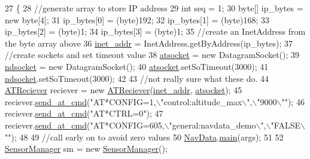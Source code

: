 \begin{DoxyCode}
27     \{
28         \textcolor{comment}{//generate array to store IP address}
29         \textcolor{keywordtype}{int} seq = 1;
30         byte[] ip\_bytes = \textcolor{keyword}{new} byte[4];
31         ip\_bytes[0] = (byte)192;
32         ip\_bytes[1] = (byte)168;
33         ip\_bytes[2] = (byte)1;
34         ip\_bytes[3] = (byte)1;
35         \textcolor{comment}{//create an InetAddress from the byte array above}
36         \hyperlink{class_drone_basics_af9aed89eb6bf900c469b8e2dd8a0ba54}{inet\_addr} = InetAddress.getByAddress(ip\_bytes);
37         \textcolor{comment}{//create sockets and set timeout value}
38         \hyperlink{class_drone_basics_adde72319658ee9fcad5d4266cf6c3ec8}{atsocket} = \textcolor{keyword}{new} DatagramSocket();
39         \hyperlink{class_drone_basics_a7257f257caa0bb8890ec9b866dad5fdc}{ndsocket} = \textcolor{keyword}{new} DatagramSocket();
40         \hyperlink{class_drone_basics_adde72319658ee9fcad5d4266cf6c3ec8}{atsocket}.setSoTimeout(3000);
41         \hyperlink{class_drone_basics_a7257f257caa0bb8890ec9b866dad5fdc}{ndsocket}.setSoTimeout(3000);
42         
43         \textcolor{comment}{//not really sure what these do.}
44         \hyperlink{class_drone_1_1_hardware_1_1_a_t_reciever}{ATReciever} reciever = \textcolor{keyword}{new} \hyperlink{class_drone_1_1_hardware_1_1_a_t_reciever}{ATReciever}(\hyperlink{class_drone_basics_af9aed89eb6bf900c469b8e2dd8a0ba54}{inet\_addr}, 
      \hyperlink{class_drone_basics_adde72319658ee9fcad5d4266cf6c3ec8}{atsocket});
45         reciever.\hyperlink{class_drone_1_1_hardware_1_1_a_t_reciever_a93352d75209626cf62bde294b35f9120}{send\_at\_cmd}(\textcolor{stringliteral}{"AT*CONFIG=1,\(\backslash\)"control:altitude\_max\(\backslash\)",\(\backslash\)"9000\(\backslash\)""});
46         reciever.\hyperlink{class_drone_1_1_hardware_1_1_a_t_reciever_a93352d75209626cf62bde294b35f9120}{send\_at\_cmd}(\textcolor{stringliteral}{"AT*CTRL=0"});
47         reciever.\hyperlink{class_drone_1_1_hardware_1_1_a_t_reciever_a93352d75209626cf62bde294b35f9120}{send\_at\_cmd}(\textcolor{stringliteral}{"AT*CONFIG=605,\(\backslash\)"general:navdata\_demo\(\backslash\)",\(\backslash\)"FALSE\(\backslash\)""});
48        
49         \textcolor{comment}{//call early on to avoid zero values}
50         \hyperlink{classworkspace_1_1_a_r_drone_nav_data_1_1src_1_1_nav_data}{NavData}.\hyperlink{classworkspace_1_1_a_r_drone_nav_data_1_1src_1_1_nav_data_ace3cd1e72bda115d0109f6f89a1e9c36}{main}(args);
51         
52         \hyperlink{class_drone_1_1_hardware_1_1_sensor_manager}{SensorManager} sm = \textcolor{keyword}{new} \hyperlink{class_drone_1_1_hardware_1_1_sensor_manager}{SensorManager}();

\end{DoxyCode}
